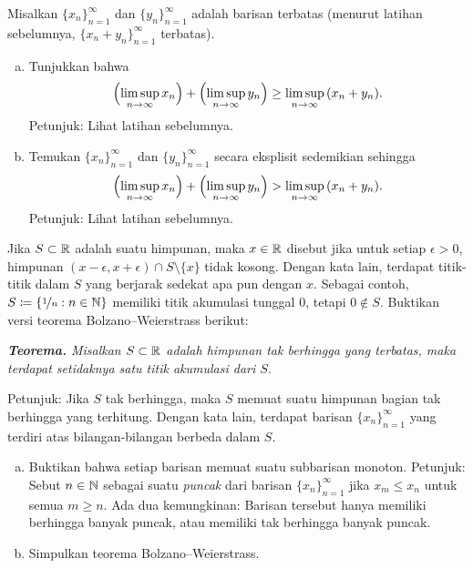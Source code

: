\begin{samepage}
\begin{exercise}
Misalkan $\{ x_n \}_{n=1}^\infty$ dan $\{ y_n \}_{n=1}^\infty$ adalah barisan terbatas (menurut
latihan sebelumnya, $\{ x_n + y_n \}_{n=1}^\infty$ terbatas).
\begin{enumerate}[a)]
\item
Tunjukkan bahwa
\begin{equation*}
\Bigl(\limsup_{n\to \infty} x_n\Bigr)
+
\Bigl(\limsup_{n\to \infty} y_n\Bigr)
\geq
\limsup_{n\to \infty} \, (x_n+y_n) .
\end{equation*}
Petunjuk: Lihat latihan sebelumnya.
\item
Temukan $\{ x_n \}_{n=1}^\infty$ dan $\{ y_n \}_{n=1}^\infty$ secara eksplisit sedemikian sehingga
\begin{equation*}
\Bigl(\limsup_{n\to \infty} x_n\Bigr)
+
\Bigl(\limsup_{n\to \infty} y_n\Bigr)
>
\limsup_{n\to \infty} \, (x_n+y_n) .
\end{equation*}
Petunjuk: Lihat latihan sebelumnya.
\end{enumerate}
\end{exercise}
\end{samepage}

\begin{exercise}
Jika $S \subset {\mathbb{R}}$ adalah suatu himpunan, maka $x \in {\mathbb{R}}$ disebut \emph{}
jika untuk setiap $\epsilon > 0$, himpunan $(x-\epsilon,x+\epsilon) \cap S
\setminus \{ x \}$ tidak kosong.  Dengan kata lain, terdapat titik-titik dalam $S$
yang berjarak sedekat apa pun dengan $x$.
Sebagai contoh, $S \coloneqq \{ \nicefrac{1}{n} : n \in {\mathbb{N}} \}$ memiliki titik akumulasi tunggal $0$, tetapi $0 \notin S$.
Buktikan versi teorema Bolzano--Weierstrass berikut:

\medskip

\noindent
\emph{\textbf{Teorema.} Misalkan $S \subset {\mathbb{R}}$ adalah himpunan tak berhingga yang terbatas,
maka terdapat setidaknya satu titik akumulasi dari $S$}.

\medskip

Petunjuk: Jika $S$ tak berhingga, maka $S$ memuat suatu himpunan bagian tak berhingga yang terhitung.
Dengan kata lain, terdapat barisan $\{ x_n \}_{n=1}^\infty$ yang terdiri atas bilangan-bilangan berbeda dalam $S$.
\end{exercise}

\begin{samepage}
\begin{exercise}[Menantang]
\leavevmode
\begin{enumerate}[a)]
\item
Buktikan bahwa setiap barisan memuat suatu subbarisan monoton.
Petunjuk: Sebut $n \in {\mathbb{N}}$ sebagai suatu \emph{puncak}
dari barisan
$\{ x_n \}_{n=1}^\infty$
jika $x_m \leq x_n$ untuk semua $m \geq n$.
Ada dua kemungkinan: Barisan tersebut hanya memiliki berhingga banyak
puncak,
atau memiliki tak berhingga banyak puncak.
\item
Simpulkan teorema Bolzano--Weierstrass.
\end{enumerate}
\end{exercise}
\end{samepage}


